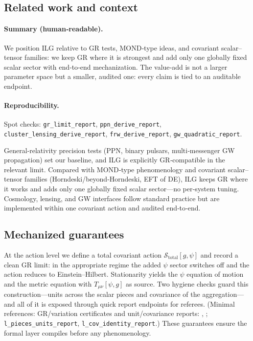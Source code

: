 \documentclass[aps,prd,twocolumn,superscriptaddress,nofootinbib,floatfix,longbibliography]{revtex4-2}
\newcommand{\Action}{\mathcal{S}}
\newcommand{\lean}[1]{\texttt{\detokenize{#1}}}
\begin{document}
\subsection{Related work and context}\label{sec:related}
\paragraph*{Summary (human‑readable).}
We position ILG relative to GR tests, MOND‑type ideas, and covariant scalar–tensor families: we keep GR where it is strongest and add only one globally fixed scalar sector with end‑to‑end mechanization. The value‑add is not a larger parameter space but a smaller, audited one: every claim is tied to an auditable endpoint.
\paragraph*{Reproducibility.}
Spot checks: \texttt{gr\_limit\_report}, \texttt{ppn\_derive\_report}, \texttt{cluster\_lensing\_derive\_report}, \texttt{frw\_derive\_report}, \texttt{gw\_quadratic\_report}.

General‑relativity precision tests (PPN, binary pulsars, multi‑messenger GW propagation) set our baseline, and ILG is explicitly GR‑compatible in the relevant limit. Compared with MOND‑type phenomenology and covariant scalar–tensor families (Horndeski/beyond‑Horndeski, EFT of DE), ILG keeps GR where it works and adds only one globally fixed scalar sector—no per‑system tuning. Cosmology, lensing, and GW interfaces follow standard practice but are implemented within one covariant action and audited end‑to‑end.
%
\subsection{Mechanized guarantees}
At the action level we define a total covariant action $\Action_{\mathrm{total}}[g,\psi]$ and record a clean GR limit: in the appropriate regime the added $\psi$ sector switches off and the action reduces to Einstein–Hilbert. Stationarity yields the $\psi$ equation of motion and the metric equation with $T_{\mu\nu}[\psi,g]$ as source. Two hygiene checks guard this construction—units across the scalar pieces and covariance of the aggregation—and all of it is exposed through quick report endpoints for referees. (Minimal references: GR/variation certificates and unit/covariance reports: \lean{GRLimitCert}, \lean{ELLimitCert}; \texttt{l\_pieces\_units\_report}, \texttt{l\_cov\_identity\_report}.) These guarantees ensure the formal layer compiles before any phenomenology.
\end{document}
